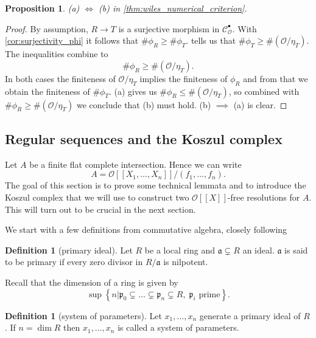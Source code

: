 \documentclass{article}
\theoremstyle{plain}%
\newtheorem{proposition}[theorem]{Proposition}
\theoremstyle{definition}
\newtheorem{definition}[theorem]{Definition}
\theoremstyle{remark}
\newcommand{\cob}{\mathcal{C}_\mathcal{O}^\bullet}
\begin{document}
\begin{proposition}\textup{\cite[cf.][corollary 5.6]{Darmon1995}}\label{prop:aequalsb}
    (a) \(\Leftrightarrow\) (b) in \cref{thm:wiles_numerical_criterion}.
\end{proposition}
\begin{proof}
    By assumption, \(R \to T\) is a surjective morphism in \(\cob\).
    With \cref{cor:surjectivity_phi} it follows that \(\#\phi_R \geq \#\phi_T\).  
    tells us that \(\#\phi_T \geq \#(\mathcal{O}/\eta_T)\).
    The inequalities combine to \[\#\phi_R \geq \#(\mathcal{O}/\eta_T).\]
    In both cases the finiteness of \(\mathcal{O}/\eta_T\) implies the finiteness of \(\phi_R\)
    and from that we obtain the finiteness of \(\#\phi_T\).
    (a) gives us \(\#\phi_R \leq \#(\mathcal{O}/\eta_T)\), so combined with \(\#\phi_R \geq \#(\mathcal{O}/\eta_T)\) 
    we conclude that (b) must hold. (b) \(\implies\) (a) is clear.
\end{proof}

\subsection{Regular sequences and the Koszul complex}
Let \(A\) be a finite flat complete intersection. Hence we can write 
\[A = \mathcal{O}[[X_1, \dots, X_n]]/(f_1, \dots, f_n).\]
The goal of this section is to prove some technical lemmata and to introduce
the Koszul complex that we will use to construct two \(\mathcal{O}[[X]]\)-free resolutions for \(A\).
This will turn out to be crucial in the next section.

We start with a few definitions from commutative algebra, closely following \cite[sec. 5.3]{Darmon1995}
\begin{definition}[primary ideal]
    Let \(R\) be a local ring and \(\mathfrak{a} \subsetneq R\) an ideal. 
    \(\mathfrak{a}\) is said to be primary if every zero divisor in \(R/\mathfrak{a}\) is nilpotent.
\end{definition}
Recall that the dimension of a ring is given by
\[
    \sup \left\{n | 
                \mathfrak{p}_0 \subsetneq \dots \subsetneq \mathfrak{p}_n \subsetneq R,\; \mathfrak{p}_i \text{ prime} 
        \right\}.
\]
\begin{definition}[system of parameters]
    Let \(x_1, \dots, x_n\) generate a primary ideal of \(R\). If \(n = \dim R\) then \(x_1, \dots, x_n\) is called 
    a system of parameters.
\end{definition}
\end{document}
